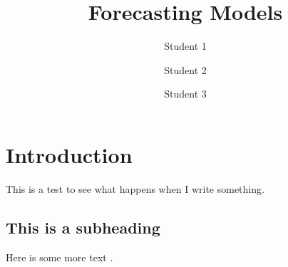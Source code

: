 \documentclass[10pt]{article}
\title{Forecasting Models}
\author{Student 1 \and Student 2 \and Student 3}
\begin{document}
\maketitle

\section{Introduction}
This is a test to see what happens when I write something.

\subsection{This is a subheading}
Here is some more text \cite{mcconnell2009analysis}.









\end{document}
